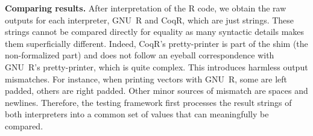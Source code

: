 \documentclass[
    sigplan,
    10pt,
    review, %
    natbib=false %
 ]{acmart}
\newcommand\CoqR{CoqR}
\begin{document}






\noindent\textbf{Comparing results.}
After interpretation of the R code, we obtain the raw outputs for each interpreter, GNU~R and \CoqR, which are just strings. These strings cannot be compared directly for equality as many syntactic details makes them superficially different. Indeed, \CoqR{}'s pretty-printer is part of the shim (the non-formalized part)
and does not follow an eyeball correspondence with GNU~R's pretty-printer, which is quite complex. This introduces harmless output mismatches. For instance, when printing vectors with GNU~R, some are left padded, others are right padded. Other minor sources of mismatch are spaces and newlines. Therefore, the testing framework first processes the result strings of both interpreters into a common set of values that can meaningfully be compared.
\end{document}
